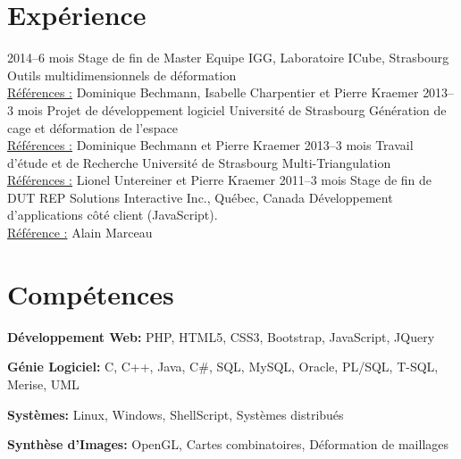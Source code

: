 \documentclass[]{friggeri-cv} %
\begin{document}
\section{Expérience}

\begin{entrylist}
\entry
{2014--6 mois}
{Stage de fin de Master}
{Equipe IGG, Laboratoire ICube, Strasbourg}
{Outils multidimensionnels de déformation \\ 
\underline{Références :} Dominique Bechmann, Isabelle Charpentier et Pierre Kraemer}
\entry
{2013--3 mois}
{Projet de développement logiciel}
{Université de Strasbourg}
{Génération de cage et déformation de l'espace \\ 
\underline{Références :} Dominique Bechmann et Pierre Kraemer}
\entry
{2013--3 mois}
{Travail d'étude et de Recherche}
{Université de Strasbourg}
{Multi-Triangulation\\\underline{Références :} Lionel Untereiner et Pierre Kraemer}
\entry
{2011--3 mois}
{Stage de fin de DUT}
{REP Solutions Interactive Inc., Québec, Canada}
{Développement d'applications côté client (JavaScript).\\
\underline{Référence :} Alain Marceau}
\end{entrylist}


\section{Compétences}

\textbf{Développement Web:}
PHP, HTML5, CSS3, Bootstrap, JavaScript, JQuery

\textbf{Génie Logiciel:}
C, C++, Java, C\#, SQL, MySQL, Oracle, PL/SQL, T-SQL, Merise, UML

\textbf{Systèmes:}
Linux, Windows, ShellScript, Systèmes distribués

\textbf{Synthèse d'Images:}
OpenGL, Cartes combinatoires, Déformation de maillages
\end{document}
